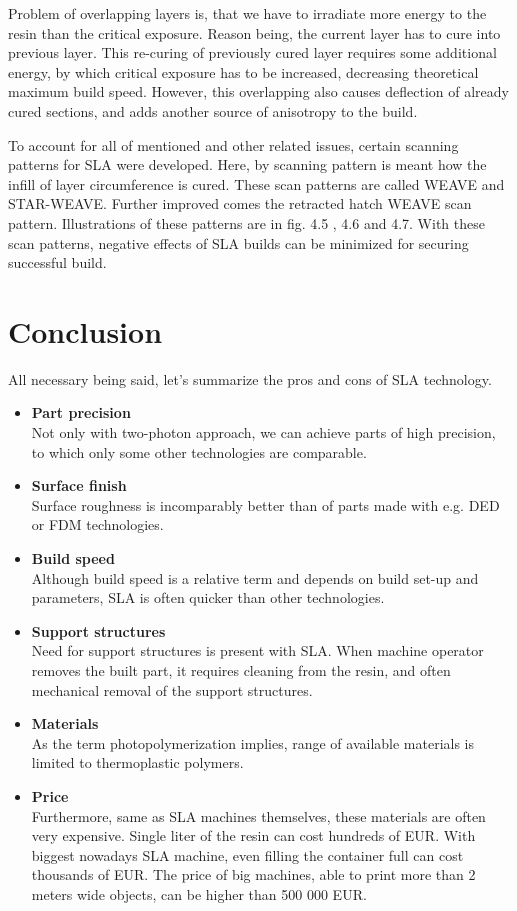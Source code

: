 \documentclass[a4paper, twoside, 11pt]{report}
\newcommand\pro{\item[$+$]}
\newcommand\con{\item[$-$]}
\begin{document}
	Problem of overlapping layers is, that we have to irradiate more energy to the resin than the critical exposure. Reason being, the current layer has to cure into previous layer. This re-curing of previously cured layer requires some additional energy, by which critical exposure has to be increased, decreasing theoretical maximum build speed. However, this overlapping also causes deflection of already cured sections, and adds another source of anisotropy to the build.
	
	To account for all of mentioned and other related issues, certain scanning patterns for SLA were developed. Here, by scanning pattern is meant how the infill of layer circumference is cured. These scan patterns are called WEAVE and STAR-WEAVE. Further improved comes the retracted hatch WEAVE scan pattern. Illustrations of these patterns are in fig. 4.5 , 4.6 and 4.7. With these scan patterns, negative effects of SLA builds can be minimized for securing successful build.

%
\section{Conclusion}
All necessary being said, let's summarize the pros and cons of SLA technology.
%
\begin{itemize}
\pro \textbf{Part precision}\\
Not only with two-photon approach, we can achieve parts of high precision, to which only some other technologies are comparable.
\pro \textbf{Surface finish}\\
Surface roughness is incomparably better than of parts made with e.g. DED or FDM technologies.
\pro \textbf{Build speed}\\
Although build speed is a relative term and depends on build set-up and parameters, SLA is often quicker than other technologies.
\\[10pt]
\con \textbf{Support structures}\\
Need for support structures is present with SLA. When machine operator removes the built part, it requires cleaning from the resin, and often mechanical removal of the support structures.
\con \textbf{Materials}\\
As the term photopolymerization implies, range of available materials is limited to thermoplastic polymers.
\con \textbf{Price}\\
Furthermore, same as SLA machines themselves, these materials are often very expensive. Single liter of the resin can cost hundreds of EUR. With biggest nowadays SLA machine, even filling the container full can cost thousands of EUR. The price of big machines, able to print more than 2 meters wide objects, can be higher than 500 000 EUR.
\end{itemize}
\end{document}
